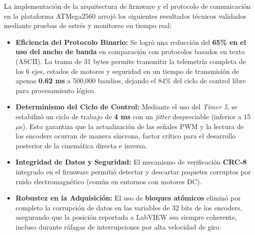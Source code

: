 \begin{resultadosFase}
	La implementación de la arquitectura de firmware y el protocolo de comunicación en la plataforma ATMega2560 arrojó los siguientes resultados técnicos validados mediante pruebas de estrés y monitoreo en tiempo real:
	
	\begin{itemize}
		\item \textbf{Eficiencia del Protocolo Binario:} Se logró una reducción del \textbf{65\% en el uso del ancho de banda} en comparación con protocolos basados en texto (ASCII). La trama de 31 bytes permite transmitir la telemetría completa de los 6 ejes, estados de motores y seguridad en un tiempo de transmisión de apenas \textbf{0.62 ms} a 500,000 baudios, dejando el 84\% del ciclo de control libre para procesamiento lógico.
		
		\item \textbf{Determinismo del Ciclo de Control:} Mediante el uso del \textit{Timer 5}, se estabilizó un ciclo de trabajo de \textbf{4 ms} con un \textit{jitter} despreciable (inferior a 15 $\mu$s). Esto garantiza que la actualización de las señales PWM y la lectura de los encoders ocurran de manera síncrona, factor crítico para el desarrollo posterior de la cinemática directa e inversa.
		
		\item \textbf{Integridad de Datos y Seguridad:} El mecanismo de verificación \textbf{CRC-8} integrado en el firmware permitió detectar y descartar paquetes corruptos por ruido electromagnético (común en entornos con motores DC). 
		
		\item \textbf{Robustez en la Adquisición:} El uso de \textbf{bloques atómicos} eliminó por completo la corrupción de datos en las variables de 32 bits de los encoders, asegurando que la posición reportada a LabVIEW sea siempre coherente, incluso durante ráfagas de interrupciones por alta velocidad de giro.
	\end{itemize}
\end{resultadosFase}